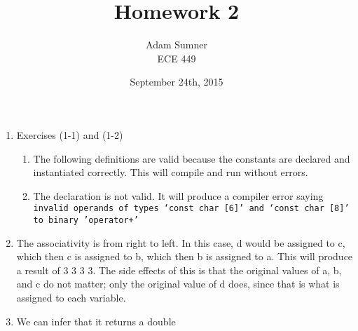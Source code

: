 \documentclass[12pt]{article}
\title{\textbf{Homework 2}}
\author{Adam Sumner \\ ECE 449}
\date{September 24th, 2015}
\begin{document}
\maketitle

\begin{enumerate}
	\item Exercises (1-1) and (1-2)
	\begin{enumerate}
		\item The following definitions are valid because the constants are declared and instantiated correctly. This will compile and run without errors.
		\item The declaration is not valid. It will produce a compiler error saying \texttt{invalid operands of types `const char [6]' and `const char [8]' to binary 'operator+'}
	\end{enumerate}
	\item The associativity is from right to left. In this case, d would be assigned to c, which then c is assigned to b, which then b is assigned to a. This will produce a result of 3 3 3 3. The side effects of this is that the original values of a, b, and c do not matter; only the original value of d does, since that is what is assigned to each variable.
	\item We can infer that it returns a double
\end{enumerate}
\end{document}
